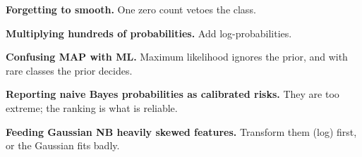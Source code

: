 \begin{pitfall}
\begin{tight}
  \item \textbf{Forgetting to smooth.} One zero count vetoes the class.
  \item \textbf{Multiplying hundreds of probabilities.} Add log-probabilities.
  \item \textbf{Confusing MAP with ML.} Maximum likelihood ignores the prior, and
        with rare classes the prior decides.
  \item \textbf{Reporting naive Bayes probabilities as calibrated risks.} They are
        too extreme; the ranking is what is reliable.
  \item \textbf{Feeding Gaussian NB heavily skewed features.} Transform them (log)
        first, or the Gaussian fits badly.
\end{tight}
\end{pitfall}

